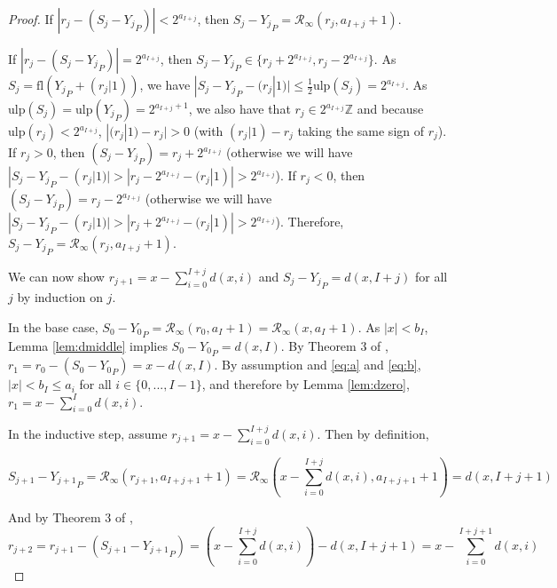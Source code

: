 \documentclass[12pt]{article}
\providecommand{\Z}{\ensuremath{\mathbb{Z}}}
\providecommand{\ulp}{\ensuremath{\text{ulp}}}
\providecommand{\fl}{\ensuremath{\text{fl}}}
\providecommand{\roundtonearestinfty}{\ensuremath{\mathcal{R}_\text{$\infty$}}}
\theoremstyle{definition}
\numberwithin{equation}{section}
\numberwithin{figure}{section}
\begin{document}
\begin{proof}
        If $|r_j - (S_j - {Y_j}_P)| < 2^{a_{I + j}}$, then $S_j - {Y_j}_P = \roundtonearestinfty(r_j, a_{I + j} + 1)$.

        If $|r_j - (S_j - {Y_j}_P)| = 2^{a_{I + j}}$, then $S_j - {Y_j}_P \in \{r_j + 2^{a_{I + j}},  r_j - 2^{a_{I + j}}\}$.
        As $S_j = \fl({Y_j}_P + (r_j|1))$, we have $|S_j - {Y_j}_P - (r_j|1)| \leq \frac{1}{2}\ulp(S_j) = 2^{a_{I + j}}$.  As $\ulp(S_j) = \ulp({Y_j}_P) = 2^{a_{I + j} + 1}$, we also have that $r_j \in 2^{a_{I + j}}\Z$  and because $\ulp(r_j) < 2^{a_{I + j}}$, $|(r_j|1) - r_j| > 0$ (with $(r_j|1) - r_j$ taking the same sign of $r_j$).
        If $r_j > 0$, then $(S_j - {Y_j}_P) = r_j + 2^{a_{I + j}}$ (otherwise we will have $|S_j - {Y_j}_P - (r_j|1)| > |r_j - 2^{a_{I + j}} - (r_j|1)| > 2^{a_{I + j}}$).
        If $r_j < 0$, then $(S_j - {Y_j}_P) = r_j - 2^{a_{I + j}}$ (otherwise we will have $|S_j - {Y_j}_P - (r_j|1)| > |r_j + 2^{a_{I + j}} - (r_j|1)| > 2^{a_{I + j}}$). Therefore, $S_j - {Y_j}_P = \roundtonearestinfty(r_j, a_{I + j} + 1)$.

        We can now show $r_{j + 1} = x - \sum\limits_{i = 0}^{I + j}d(x, i)$ and $S_j - {Y_j}_P = d(x, I + j)$ for all $j$ by induction on $j$.

        In the base case, $S_0 - {Y_0}_P = \roundtonearestinfty(r_0, a_I + 1) = \roundtonearestinfty(x, a_I + 1)$. As $|x| < b_I$, Lemma \ref{lem:dmiddle} implies $S_0 - {Y_0}_P = d(x, I)$. By Theorem 3 of \cite{repsum}, $r_1 = r_0 - (S_0 - {Y_0}_P) = x - d(x,I)$. By assumption and  \eqref{eq:a} and \eqref{eq:b}, $|x| < b_I \leq a_{i}$ for all $i \in \{0, ..., I - 1\}$, and therefore by Lemma \ref{lem:dzero}, $r_1 = x - \sum\limits_{i = 0}^Id(x, i)$.

        In the inductive step, assume $r_{j + 1} = x - \sum\limits_{i = 0}^{I + j}d(x, i)$. Then by definition,

        \begin{equation*}
          S_{j + 1} - {Y_{j + 1}}_P = \roundtonearestinfty(r_{j + 1}, a_{I + j + 1} + 1) = \roundtonearestinfty(x - \sum\limits_{i = 0}^{I + j}d(x, i), a_{I + j + 1} + 1) = d(x, I + j + 1)
        \end{equation*}

        And by Theorem 3 of \cite{repsum},
        \begin{equation*}
          r_{j + 2} = r_{j + 1} - (S_{j + 1} - {Y_{j + 1}}_P) = (x - \sum\limits_{i = 0}^{I + j}d(x, i)) - d(x, I + j + 1) = x - \sum\limits_{i = 0}^{I + j + 1}d(x, i)
        \end{equation*}
      \end{proof}
\end{document}
